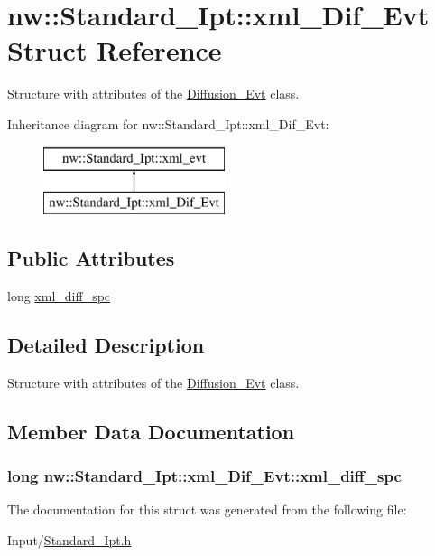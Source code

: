 \hypertarget{structnw_1_1_standard___ipt_1_1xml___dif___evt}{\section{nw\+:\+:Standard\+\_\+\+Ipt\+:\+:xml\+\_\+\+Dif\+\_\+\+Evt Struct Reference}
\label{structnw_1_1_standard___ipt_1_1xml___dif___evt}
}


Structure with attributes of the \hyperlink{classnw_1_1_diffusion___evt}{Diffusion\+\_\+\+Evt} class.  


Inheritance diagram for nw\+:\+:Standard\+\_\+\+Ipt\+:\+:xml\+\_\+\+Dif\+\_\+\+Evt\+:\begin{figure}[H]
\begin{center}
\leavevmode
\includegraphics[height=2.000000cm]{de/d1d/structnw_1_1_standard___ipt_1_1xml___dif___evt}
\end{center}
\end{figure}
\subsection*{Public Attributes}
\begin{DoxyCompactItemize}
\item 
long \hyperlink{structnw_1_1_standard___ipt_1_1xml___dif___evt_ac806ec8aa26b8b632163acc327c89d20}{xml\+\_\+diff\+\_\+spc}
\end{DoxyCompactItemize}


\subsection{Detailed Description}
Structure with attributes of the \hyperlink{classnw_1_1_diffusion___evt}{Diffusion\+\_\+\+Evt} class. 

\subsection{Member Data Documentation}
\hypertarget{structnw_1_1_standard___ipt_1_1xml___dif___evt_ac806ec8aa26b8b632163acc327c89d20}{
\subsubsection[{xml\+\_\+diff\+\_\+spc}]{\setlength{\rightskip}{0pt plus 5cm}long nw\+::\+Standard\+\_\+\+Ipt\+::xml\+\_\+\+Dif\+\_\+\+Evt\+::xml\+\_\+diff\+\_\+spc}}\label{structnw_1_1_standard___ipt_1_1xml___dif___evt_ac806ec8aa26b8b632163acc327c89d20}


The documentation for this struct was generated from the following file\+:\begin{DoxyCompactItemize}
\item 
Input/\hyperlink{_standard___ipt_8h}{Standard\+\_\+\+Ipt.\+h}\end{DoxyCompactItemize}
